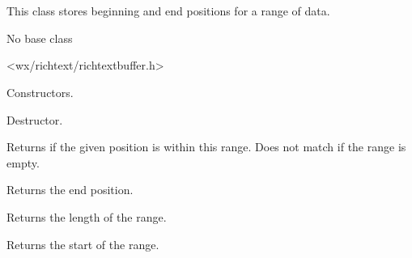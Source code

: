 \section{}\label{wxrichtextrange}

This class stores beginning and end positions for a range of data.


No base class


<wx/richtext/richtextbuffer.h>



\label{wxrichtextrangewxrichtextrange}




Constructors.

\label{wxrichtextrangedtor}


Destructor.

\label{wxrichtextrangecontains}


Returns \true if the given position is within this range. Does not
match if the range is empty.

\label{wxrichtextrangegetend}


Returns the end position.

\label{wxrichtextrangegetlength}


Returns the length of the range.

\label{wxrichtextrangegetstart}


Returns the start of the range.

